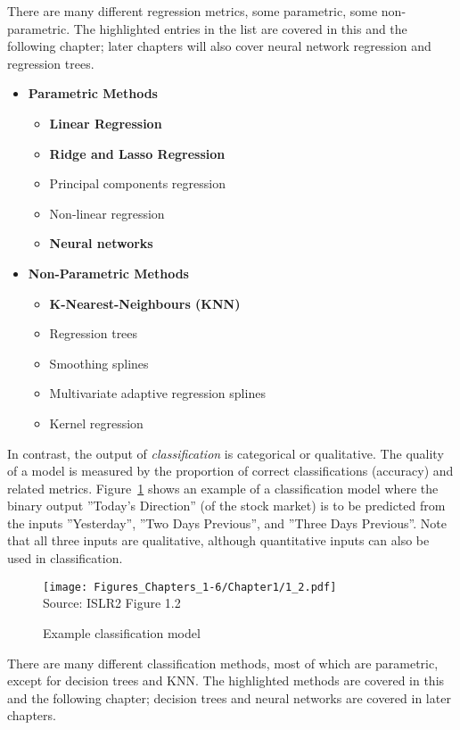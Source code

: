 There are many different regression metrics, some parametric, some non-parametric. The highlighted entries in the list are covered in this and the following chapter; later chapters will also cover neural network regression and regression trees. 

\begin{itemize}
\item \textbf{Parametric Methods}
\begin{itemize}
   \item \textbf{Linear Regression}
   \item \textbf{Ridge and Lasso Regression}
   \item Principal components regression
   \item Non-linear regression
   \item \textbf{Neural networks}
\end{itemize}
\item \textbf{Non-Parametric Methods}
\begin{itemize}
  \item \textbf{K-Nearest-Neighbours (KNN)}
  \item Regression trees
  \item Smoothing splines
  \item Multivariate adaptive regression splines
  \item Kernel regression
\end{itemize}
\end{itemize}

In contrast, the output of \emph{classification} is categorical or qualitative. The quality of a model is measured by the proportion of correct classifications (accuracy) and related metrics. Figure~\ref{fig:classification} shows an example of a classification model where the binary output ''Today's Direction'' (of the stock market) is to be predicted from the inputs ''Yesterday'', ''Two Days Previous'', and ''Three Days Previous''. Note that all three inputs are qualitative, although quantitative inputs can also be used in classification.

\begin{figure}
\centering
\texttt{[image: Figures\_Chapters\_1-6/Chapter1/1\_2.pdf]} \\
\scriptsize Source: ISLR2 Figure 1.2
\caption{Example classification model}
\label{fig:classification}
\end{figure}

There are many different classification methods, most of which are parametric, except for decision trees and KNN. The highlighted methods are covered in this and the following chapter; decision trees and neural networks are covered in later chapters.

